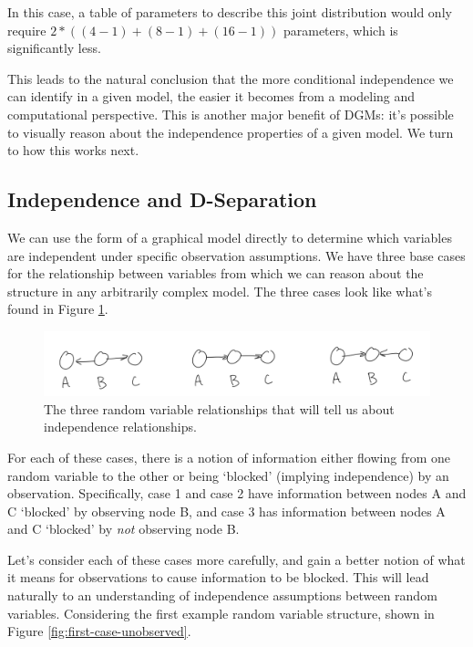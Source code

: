 In this case, a table of parameters to describe this joint distribution would only require $2 * ((4 - 1) + (8 - 1) + (16 - 1))$ parameters, which is significantly less.

This leads to the natural conclusion that the more conditional independence we can identify in a given model, the easier it becomes from a modeling and computational perspective. This is another major benefit of DGMs: it's possible to visually reason about the independence properties of a given model. We turn to how this works next.

\subsection{Independence and D-Separation}
We can use the form of a graphical model directly to determine which variables are independent under specific observation assumptions. We have three base cases for the relationship between variables from which we can reason about the structure in any arbitrarily complex model. The three cases look like what's found in Figure \ref{fig:indep-structure}.
\begin{figure}
	\centering
	\includegraphics[width=0.5\paperwidth]{../GraphicalModels/fig/indep-structure.png}
    \caption{The three random variable relationships that will tell us about independence relationships.}
	\label{fig:indep-structure}
\end{figure}
For each of these cases, there is a notion of information either flowing from one random variable to the other or being `blocked' (implying independence) by an observation. Specifically, case 1 and case 2 have information between nodes A and C `blocked' by observing node B, and case 3 has information between nodes A and C `blocked' by \textit{not} observing node B.

Let's consider each of these cases more carefully, and gain a better notion of what it means for observations to cause information to be blocked. This will lead naturally to an understanding of independence assumptions between random variables. Considering the first example random variable structure, shown in Figure \ref{fig:first-case-unobserved}.

